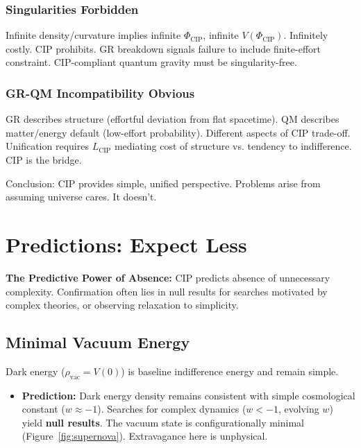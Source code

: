 \documentclass[11pt, a4paper]{article}
\newcommand{\subt}[1]{\mathrm{#1}}
\begin{document}
\subsubsection{Singularities Forbidden}
Infinite density/curvature implies infinite $\Phi_{\subt{CIP}}$, infinite $V(\Phi_{\subt{CIP}})$. Infinitely costly. CIP prohibits. GR breakdown signals failure to include finite-effort constraint. CIP-compliant quantum gravity must be singularity-free.

\subsubsection{GR-QM Incompatibility Obvious}
GR describes structure (effortful deviation from flat spacetime). QM describes matter/energy default (low-effort probability). Different aspects of CIP trade-off. Unification requires $L_{\subt{CIP}}$ mediating cost of structure vs. tendency to indifference. CIP is the bridge.

Conclusion: CIP provides simple, unified perspective. Problems arise from assuming universe cares. It doesn't.


\section{Predictions: Expect Less} \label{sec:predictions}

\textbf{The Predictive Power of Absence:} CIP predicts absence of unnecessary complexity. Confirmation often lies in null results for searches motivated by complex theories, or observing relaxation to simplicity.

\subsection{Minimal Vacuum Energy} \label{sec:pred_vac}
Dark energy ($\rho_{\subt{vac}} = V(0)$) is baseline indifference energy and remain simple.
\begin{itemize}
    \item \textbf{Prediction:} Dark energy density remains consistent with simple cosmological constant ($w \approx -1$). Searches for complex dynamics ($w < -1$, evolving $w$) yield \textbf{null results}. The vacuum state is configurationally minimal (Figure~\ref{fig:supernova}). Extravagance here is unphysical.
\end{itemize}
\end{document}
